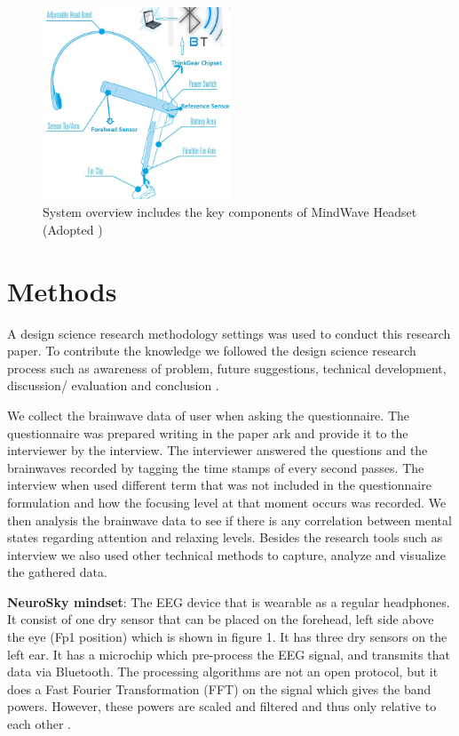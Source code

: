 \documentclass{bioinfo}
\begin{document}
\begin{figure}[ht!]
\includegraphics[width=0.5\textwidth]{Neurosky_headset.jpg}
\caption{ System overview includes the key components of MindWave Headset (Adopted \citep{NeuroSky})}
\end{figure}



\section{Methods}

A design science research methodology settings was used to conduct this research paper. To contribute the knowledge we followed the design science research process such as awareness of problem, future suggestions, technical development, discussion/ evaluation and conclusion \citep{vaishnavi}.

We collect the brainwave data of user when asking the questionnaire. The questionnaire was prepared writing in the paper ark and provide it to the interviewer by the interview. The interviewer answered the questions and the brainwaves recorded by tagging the time stamps of every second passes. The interview when used different term that was not included in the questionnaire formulation and how the focusing level at that moment occurs was recorded. We then analysis the brainwave data to see if there is any correlation between mental states regarding attention and relaxing levels. Besides the research tools such as interview we also used other technical methods to capture, analyze and visualize the gathered data.

\textbf{NeuroSky mindset}: The EEG device that is wearable as a regular headphones. It consist of one dry sensor that can be placed on the forehead, left side above the eye (Fp1 position) \citep{stonehill} which is shown in figure 1. It has three dry sensors on the left ear. It has a microchip which pre-process the EEG signal, and transmits that data via Bluetooth. The processing algorithms are not an open protocol, but it does a Fast Fourier Transformation (FFT) on the signal which gives the band powers. However, these powers are scaled and filtered and thus only relative to each other \citep{NeuroSky}.
\end{document}
